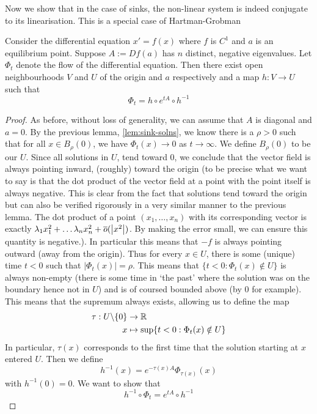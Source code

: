 Now we show that in the case of sinks, the non-linear system is indeed conjugate to its linearisation. This is a special case of Hartman-Grobman
\begin{proposition}\label{prop:homeo-special-case}
Consider the differential equation $x' = f(x)$ where $f$ is $C^1$ and $a$ is an equilibrium point. Suppose $A := Df(a)$ has $n$ distinct, negative eigenvalues. Let $\Phi_t$ denote the flow of the differential equation. Then there exist open neighbourhoods $V$ and $U$ of the origin and $a$ respectively and a map $h: V \to U$ such that 
$$ \Phi_t = h \circ e^{tA} \circ h^{-1} $$
\end{proposition}
\begin{proof}
As before, without loss of generality, we can assume that $A$ is diagonal and $a = 0$. By the previous lemma, \autoref{lem:sink-solns}, we know there is a $\rho > 0$ such that for all $x \in B_\rho(0)$, we have $\Phi_t(x) \to 0$ as $t \to \infty$. We define $B_\rho(0)$ to be our $U$. Since all solutions in $U$, tend toward 0, we conclude that the vector field is always pointing inward, (roughly) toward the origin (to be precise what we want to say is that the dot product of the vector field at a point with the point itself is always negative. This is clear from the fact that solutions tend toward the origin but can also be verified rigorously in a very similar manner to the previous lemma. The dot product of a point $(x_1, \dots, x_n)$ with its corresponding vector is exactly $\lambda_1 x_1^2 + \dots \lambda_n x_n^2 + \overline{o}(\left|x^2\right|)$. By making the error small, we can ensure this quantity is negative.). In particular this means that $-f$ is always pointing outward (away from the origin). Thus for every $x \in U$, there is some (unique) time $t < 0$ such that $\left|\Phi_t(x)\right| = \rho$. This means that $\{t < 0: \Phi_t(x) \notin U\}$ is always non-empty (there is some time in `the past' where the solution was on the boundary hence not in $U$) and is of coursed bounded above (by 0 for example). This means that the supremum always exists, allowing us to define the map
\begin{align*}
    \tau: U \backslash \{0\} &\to \mathbb{R}\\
    x &\mapsto \sup \{t < 0: \Phi_t(x) \notin U\}
\end{align*}
In particular, $\tau(x)$ corresponds to the first time that the solution starting at $x$ entered $U$. Then we define
$$ h^{-1}(x) = e^{-\tau(x) A} \Phi_{\tau(x)} (x) $$
with $h^{-1}(0) = 0$.
We want to show that 
$$ h^{-1} \circ \Phi_t = e^{tA} \circ h^{-1} $$

\end{proof}
